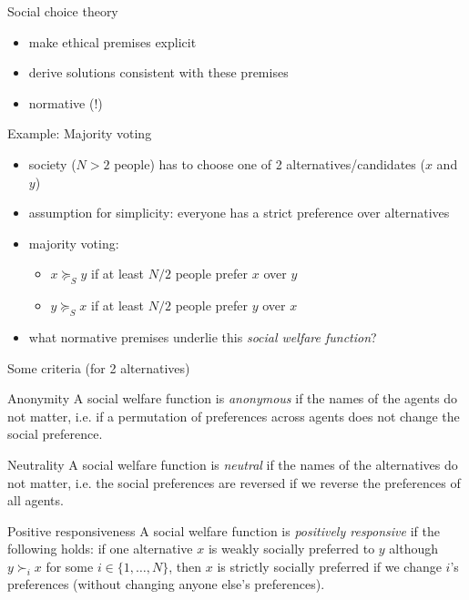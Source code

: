 \documentclass[bigger]{beamer}
\begin{document}
\begin{frame}[label={sec:orgf93a0b8}]{Social choice theory}
\begin{itemize}
\item make ethical premises explicit
\item derive solutions consistent with these premises
\item normative (!)
\end{itemize}
\end{frame}
\begin{frame}[label={sec:org0392099}]{Example: Majority voting}
\begin{itemize}
\item society (\(N>2\) people) has to choose one of 2 alternatives/candidates (\(x\) and \(y\))
\item assumption for simplicity: everyone has a strict preference over alternatives
\item majority voting:
\begin{itemize}
\item \(x\succeq_S y\) if at least \(N/2\) people prefer \(x\) over \(y\)
\item \(y\succeq_S x\) if at least \(N/2\) people prefer \(y\) over \(x\)
\end{itemize}
\item what normative premises underlie this \emph{social welfare function}?
\end{itemize}
\end{frame}
\begin{frame}[label={sec:org1f3ece0}]{Some criteria (for 2 alternatives)}
\begin{block}{Anonymity}
A social welfare function is \emph{anonymous} if the names of the agents do not matter, i.e. if a permutation of preferences across agents does not change the social preference.
\end{block}

\begin{block}{Neutrality}
A social welfare function is \emph{neutral} if the names of the alternatives do not matter, i.e. the social preferences are reversed if we reverse the preferences of all agents.
\end{block}

\begin{block}{Positive responsiveness}
A social welfare function is \emph{positively responsive} if the following holds: if one alternative \(x\) is weakly socially preferred to \(y\) although \(y\succ_i x\) for some \(i\in\{1,\dots,N\}\), then \(x\) is strictly socially preferred if we change \(i\)'s preferences (without changing anyone else's preferences).
\end{block}
\end{frame}
\end{document}
